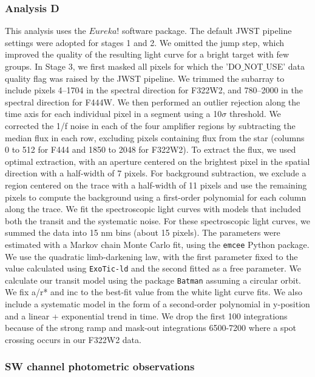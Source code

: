 \documentclass[sn-standardnature]{sn-jnl}%
\begin{document}
\subsubsection*{Analysis D}

This analysis uses the $Eureka!$  software package. The default JWST pipeline settings were adopted for stages 1 and 2. We omitted the jump step, which improved the quality of the resulting light curve for a bright target with few groups. In Stage 3, we first masked all pixels for which the 'DO$\_$NOT$\_$USE’ data quality flag was raised by the JWST pipeline. We trimmed the subarray to include pixels 4–1704 in the spectral direction for F322W2, and 780–2000 in the spectral direction for F444W. We then performed an outlier rejection along the time axis for each individual pixel in a segment using a 10$\sigma$ threshold. We corrected the 1/f noise in each of the four amplifier regions by subtracting the median flux in each row, excluding pixels containing flux from the star (columns 0 to 512 for F444 and 1850 to 2048 for F322W2). To extract the flux, we used optimal extraction, with an aperture centered on the brightest pixel in the spatial direction with a half-width of 7 pixels. For background subtraction, we exclude a region centered on the trace with a half-width of 11 pixels and use the remaining pixels to compute the background using a first-order polynomial for each column along the trace. We fit the spectroscopic light curves with models that included both the transit and the systematic noise. For these spectroscopic light curves, we summed the data into 15 nm bins (about 15 pixels). The parameters were estimated with a Markov chain Monte Carlo fit, using the \texttt{emcee}  Python package. We use the quadratic limb-darkening law, with the first parameter fixed to the value calculated using \texttt{ExoTic-ld}  and the second fitted as a free parameter. We calculate our transit model using the package \texttt{Batman}  assuming a circular orbit. We fix a/r* and inc to the best-fit value from the white light curve fits. We also include a systematic model in the form of a second-order polynomial in y-position and a linear + exponential trend in time. We drop the first 100 integrations because of the strong ramp and mask-out integrations 6500-7200 where a spot crossing occurs in our F322W2 data.

\subsubsection*{SW channel photometric observations}
\end{document}
